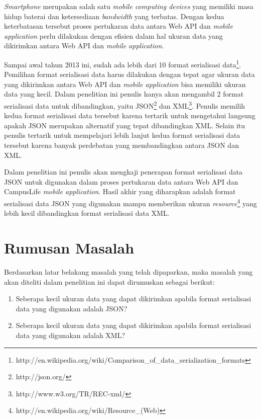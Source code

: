\documentclass[a4paper, 12pt]{report}
\begin{document}
\onehalfspacing \textit{Smartphone} merupakan salah satu \textit{mobile computing devices} yang memiliki masa hidup baterai dan ketersediaan \textit{bandwidth} yang terbatas.\cite{challenging-issues-and-limitations-of-mobile-computing} Dengan kedua keterbatasan tersebut proses pertukaran data antara Web API dan \textit{mobile application} perlu dilakukan dengan efisien dalam hal ukuran data yang dikirimkan antara Web API dan \textit{mobile application}.

\onehalfspacing Sampai awal tahun 2013 ini, sudah ada lebih dari 10 format serialisasi data\footnote{http://en.wikipedia.org/wiki/Comparison\_of\_data\_serialization\_formats}. Pemilihan format serialisasi data harus dilakukan dengan tepat agar ukuran data yang dikirimkan antara Web API dan \textit{mobile application} bisa memiliki ukuran data yang kecil. Dalam penelitian ini penulis hanya akan mengambil 2 format serialisasi data untuk dibandingkan, yaitu JSON\footnote{http://json.org/} dan XML\footnote{http://www.w3.org/TR/REC-xml/}. Penulis memilih kedua format serialisasi data tersebut karena tertarik untuk mengetahui langsung apakah JSON merupakan alternatif yang tepat dibandingkan XML. Selain itu penulis tertarik untuk mempelajari lebih lanjut kedua format serialisasi data tersebut karena banyak perdebatan yang membandingkan antara JSON dan XML. \cite{json-vs-xml-debate}

\onehalfspacing Dalam penelitian ini penulis akan mengkaji penerapan format serialisasi data JSON untuk digunakan dalam proses pertukaran data antara Web API dan CampusLife \textit{mobile application}. Hasil akhir yang diharapkan adalah format serialisasi data JSON yang digunakan mampu memberikan ukuran \textit{resource}\footnote{http://en.wikipedia.org/wiki/Resource\_(Web)} yang lebih kecil dibandingkan format serialisasi data XML.\cite{json-fat-free}

\section*{Rumusan Masalah}
\onehalfspacing Berdasarkan latar belakang masalah yang telah dipaparkan, maka masalah yang akan diteliti dalam penelitian ini dapat dirumuskan sebagai berikut:
\begin{enumerate}
  \item Seberapa kecil ukuran data yang dapat dikirimkan apabila format serialisasi data yang digunakan adalah JSON?
  \item Seberapa kecil ukuran data yang dapat dikirimkan apabila format serialisasi data yang digunakan adalah XML?
\end{enumerate}
\end{document}
